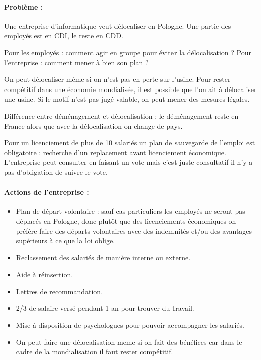 \paragraph{Problème :}
Une entreprise d’informatique veut délocaliser en Pologne.
Une partie des employés est en CDI, le reste en CDD.

Pour les employés : comment agir en groupe pour éviter la délocalisation ?
Pour l'entreprise : comment mener à bien son plan ?

On peut délocaliser même si on n’est pas en perte sur l’usine. Pour rester compétitif dans une économie mondialisée, il est possible que l’on ait à délocaliser une usine.
Si le motif n’est pas jugé valable, on peut mener des mesures légales.

Différence entre déménagement et délocalisation : le déménagement reste en France alors que avec la délocalisation on change de pays.

Pour un licenciement de plus de 10 salariés un plan de sauvegarde de l'emploi est obligatoire : recherche d'un replacement avant licenciement économique.
L’entreprise peut consulter en faisant un vote mais c'est juste consultatif il n'y a pas d'obligation de suivre le vote.

\paragraph{Actions de l'entreprise :}
	\begin{itemize}
	\item[\textbullet] Plan de départ volontaire : sauf cas particuliers les employés ne seront pas déplacés en Pologne, donc plutôt que des licenciements économiques on préfère faire des départs volontaires avec des indemnités et/ou des avantages supérieurs à ce que la loi oblige.
	\item[\textbullet] Reclassement des salariés de manière interne ou externe.
	\item[\textbullet] Aide à réinsertion.
	\item[\textbullet] Lettres de recommandation.
	\item[\textbullet] 2/3 de salaire versé pendant 1 an pour trouver du travail.
	\item[\textbullet] Mise à disposition de psychologues pour pouvoir accompagner les salariés.
	\item[\textbullet] On peut faire une délocalisation meme si on fait des bénéfices car dans le cadre de la mondialisation il faut rester compétitif.
	\end{itemize}
	

